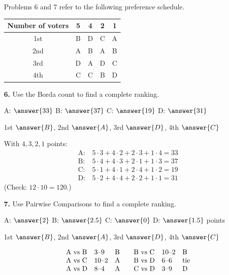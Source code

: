 \documentclass[12pt]{ximera}
\begin{document}
\begin{problem}
Problems 6 and 7 refer to the following preference schedule.
\begin{center}
\begin{tabular}{c|cccc}
Number of voters & 5 & 4 & 2 & 1\\\hline
1st & B & D & C & A\\
2nd & A & B & A & B\\
3rd & D & A & D & C\\
4th & C & C & B & D
\end{tabular}
\end{center}

\begin{prompt}
\textbf{6.} Use the Borda count to find a complete ranking.

A: $\answer{33}$ \quad B: $\answer{37}$ \quad C: $\answer{19}$ \quad D: $\answer{31}$

\smallskip
1st $\answer{B}$, 2nd $\answer{A}$, 3rd $\answer{D}$, 4th $\answer{C}$

\begin{feedback}
With $4,3,2,1$ points:
\[
\begin{aligned}
\text{A:}&\ 5\cdot3+4\cdot2+2\cdot3+1\cdot4=33\\
\text{B:}&\ 5\cdot4+4\cdot3+2\cdot1+1\cdot3=37\\
\text{C:}&\ 5\cdot1+4\cdot1+2\cdot4+1\cdot2=19\\
\text{D:}&\ 5\cdot2+4\cdot4+2\cdot2+1\cdot1=31
\end{aligned}
\]
(Check: $12\cdot10=120$.)
\end{feedback}
\end{prompt}

\begin{prompt}
\textbf{7.} Use Pairwise Comparisons to find a complete ranking.

A: $\answer{2}$ \quad B: $\answer{2.5}$ \quad C: $\answer{0}$ \quad D: $\answer{1.5}$
points

\smallskip
1st $\answer{B}$, 2nd $\answer{A}$, 3rd $\answer{D}$, 4th $\answer{C}$

\begin{feedback}
\[
\begin{array}{lll@{\qquad}lll}
\text{A vs B} & 3\text{--}9 & \text{B} & \text{B vs C} & 10\text{--}2 & \text{B}\\
\text{A vs C} & 10\text{--}2 & \text{A} & \text{B vs D} & 6\text{--}6 & \text{tie}\\
\text{A vs D} & 8\text{--}4 & \text{A} & \text{C vs D} & 3\text{--}9 & \text{D}
\end{array}
\]
\end{feedback}
\end{prompt}
\end{problem}
\end{document}
